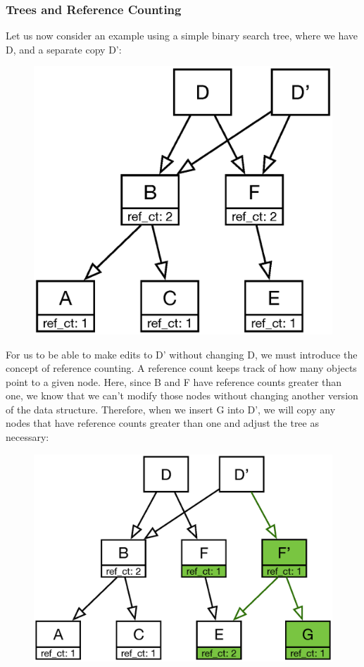 \documentclass[preprint]{sigplanconf}
\begin{document}
\subsubsection{Trees and Reference Counting}
Let us now consider an example using a simple binary search tree, where we have D, and a separate copy D':
\begin{figure}[H]
\includegraphics[scale=.43]{treefig}
\centering
\end{figure}
For us to be able to make edits to D' without changing D, we must introduce the concept of reference counting.
A reference count keeps track of how many objects point to a given node.
Here, since B and F have reference counts greater than one, we know that we can't modify those nodes without changing another version of the data structure.
Therefore, when we insert G into D', we will copy any nodes that have reference counts greater than one and adjust the tree as necessary:
\begin{figure}[H]
\includegraphics[scale=.43]{treefig2}
\centering
\end{figure}
\end{document}

